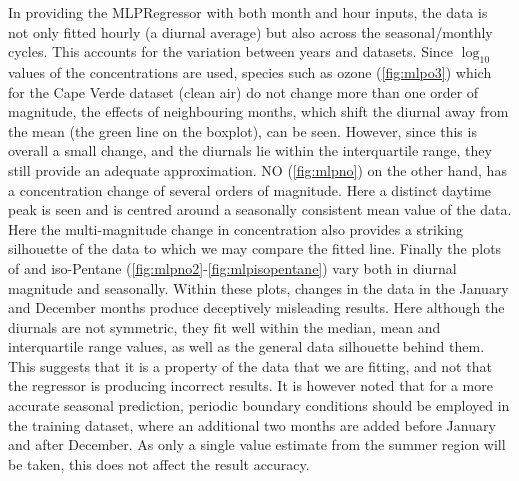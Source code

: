 In providing the MLPRegressor with both month and hour inputs, the data is not only fitted hourly (a diurnal average) but also across the seasonal/monthly cycles. This accounts for the variation between years and datasets. Since $\log_{10}$ values of the concentrations are used, species such as ozone (\autoref{fig:mlpo3}) which for the Cape Verde dataset (clean air) do not change more than one order of magnitude, the effects of neighbouring months, which shift the diurnal away from the mean (the green line on the boxplot), can be seen. However, since this is overall a small change, and the diurnals lie within the interquartile range, they still provide an adequate approximation. NO (\autoref{fig:mlpno}) on the other hand, has a concentration change of several orders of magnitude. Here a distinct daytime peak is seen and is centred around a seasonally consistent mean value of the data. Here the multi-magnitude change in concentration also provides a striking silhouette of the data to which we may compare the fitted line. 
Finally the plots of  and iso-Pentane (\autoref{fig:mlpno2}-\ref{fig:mlpisopentane}) vary both in diurnal magnitude and seasonally. Within these plots, changes in the data in the January and December months produce deceptively misleading results. Here although the diurnals are not symmetric, they fit well within the median, mean and interquartile range values, as well as the general data silhouette behind them. This suggests that it is a property of the data that we are fitting, and not that the regressor is producing incorrect results. It is however noted that for a more accurate seasonal prediction, periodic boundary conditions should be employed in the training dataset, where an additional two months are added before January and after December. As only a single value estimate from the summer region will be taken, this does not affect the result accuracy. 

